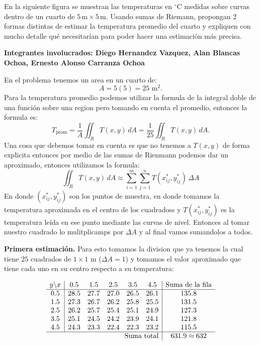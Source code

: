 \begin{ejercicio}
En la siguiente figura se muestran las temperaturas en $^\circ\text{C}$ medidas sobre curvas dentro de un cuarto de $5\,\text{m} \times 5\,\text{m}$. Usando sumas de Riemann, propongan 2 formas distintas de estimar la temperatura promedio del cuarto y expliquen con mucho detalle qué necesitarían para poder hacer una estimación más precisa.
\end{ejercicio}

\begin{respuesta}
 \textbf{Integrantes involucrados: Diego Hernandez Vazquez, Alan Blancas Ochoa, Ernesto Alonso Carranza Ochoa}

En el problema tenemos un area en un cuarto de: 
\[
A=5(5)=25\text{ m}^2.
\]
Para la temperatura promedio podemos utilizar la formula de la integral doble de una función sobre una region pero tomando en cuenta el promedio, entonces la formula es: 
\[
T_{\mathrm{prom}}=\frac{1}{A}\iint_R T(x,y)\,dA=\frac{1}{25}\iint_R T(x,y)\,dA .
\]
Una cosa que debemos tomar en cuenta es que no tenemos a $T(x,y)$ de forma explicita entonces por medio de las sumas de Rienmann podemos dar un aproximado, entonces utilizamos la formula:
\[
\iint_R T(x,y)\,dA\approx\sum_{i=1}^{m}\sum_{j=1}^{n}T(x_{ij}^*,y_{ij}^*)\,\Delta A
\]
En donde \((x_{ij}^*,y_{ij}^*)\) son los puntos de muestra, en donde tomamos la temperatura aproximada en el centro de los cuadradoss y \(T(x_{ij}^*,y_{ij}^*)\) es la temperatura leída en ese punto mediante las curvas de nivel. Entonces al tomar nuestro cuadrado lo mulitplicamps por \(\Delta A\) y al final vamos sumandolos a todos.

\textbf{Primera estimación.} Para esto tomamos la division que ya tenemos la cual tiene $25$ cuadrados de $1\times1$ m
($\Delta A=1$) y tomamos el valor aproximado que tiene cada uno en su centro respecto a su temperatura: 

\[
\begin{array}{c|ccccc|c}
y\backslash x & 0.5 & 1.5 & 2.5 & 3.5 & 4.5 & \text{Suma de la fila}\\\hline
0.5 & 28.5 & 27.7 & 27.0 & 26.5 & 26.1 & 135.8\\
1.5 & 27.3 & 26.7 & 26.2 & 25.8 & 25.5 & 131.5\\
2.5 & 26.2 & 25.7 & 25.4 & 25.1 & 24.9 & 127.3\\
3.5 & 25.1 & 24.5 & 24.2 & 23.9 & 24.1 & 121.8\\
4.5 & 24.3 & 23.3 & 22.4 & 22.3 & 23.2 & 115.5\\\hline
\multicolumn{6}{r|}{\text{Suma total}} & 631.9\approx 632
\end{array}
\]


\end{respuesta}
